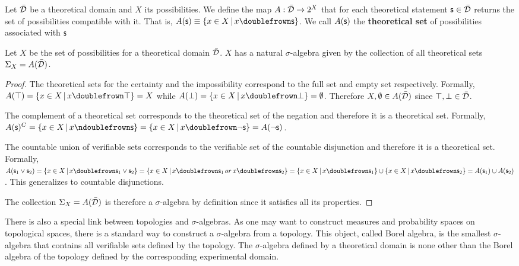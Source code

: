 	\begin{mathSection}
		
		\begin{defn}
			Let $\bar{\mathcal{D}}$ be a theoretical domain and $X$ its possibilities. We define the map $A : \bar{\mathcal{D}} \rightarrow 2^X$ that for each theoretical statement $\mathsf{s} \in \bar{\mathcal{D}}$ returns the set of possibilities compatible with it. That is, $A(\stmt)\equiv\{ x \in X \, | \, x \comp \stmt\}$. We call $A(\mathsf{s})$ the \textbf{theoretical set} of possibilities associated with $\mathsf{s}$
		\end{defn}
		
		\begin{prop}
			Let $X$ be the set of possibilities for a theoretical domain $\bar{\mathcal{D}}$. $X$ has a natural $\sigma$-algebra given by the collection of all theoretical sets $\Sigma_X=A(\bar{\mathcal{D}})$.
		\end{prop}
		
		\begin{proof}
			The theoretical sets for the certainty and the impossibility correspond to the full set and empty set respectively. Formally, $A(\certainty) = \{ x \in X \, | \, x \comp \certainty\} = X$ while $A(\impossibility) = \{ x \in X \, | \, x \comp \impossibility\} = \emptyset$. Therefore $X, \emptyset \in A(\bar{\mathcal{D}})$ since $\top, \bot \in \bar{\mathcal{D}}$.
			
			The complement of a theoretical set corresponds to the theoretical set of the negation and therefore it is a theoretical set. Formally, $A(\stmt)^C = \{ x \in X \, | \, x \ncomp \stmt\} =  \{ x \in X \, | \, x \comp \NOT\stmt\} = A(\NOT\stmt)$.
			
			The countable union of verifiable sets corresponds to the verifiable set of the countable disjunction and therefore it is a theoretical set. Formally, $A(\stmt_1\OR\stmt_2) = \{ x \in X \, | \, x \comp \stmt_1\OR\stmt_2\} =  \{ x \in X \, | \, x \comp \stmt_1 \, or \, x \comp \stmt_2\} = \{ x \in X \, | \, x \comp \stmt_1\} \cup \{ x \in X \, | \, x \comp \stmt_2\} = A(\stmt_1) \cup A(\stmt_2)$. This generalizes to countable disjunctions.
			
			The collection $\Sigma_X=A(\bar{\mathcal{D}})$ is therefore a $\sigma$-algebra by definition since it satisfies all its properties.
		\end{proof}
	\end{mathSection}
	
	There is also a special link between topologies and $\sigma$-algebras. As one may want to construct measures and probability spaces on topological spaces, there is a standard way to construct a $\sigma$-algebra from a topology. This object, called Borel algebra, is the smallest $\sigma$-algebra that contains all verifiable sets defined by the topology. The $\sigma$-algebra defined by a theoretical domain is none other than the Borel algebra of the topology defined by the corresponding experimental domain.
	
